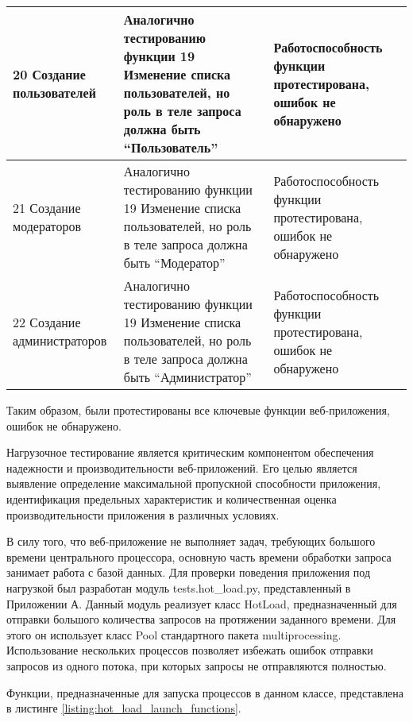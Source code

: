 \begin{longtable}{|
    p{33mm}|
    p{90mm}|
    p{42mm}|
}
    20 Создание пользователей & Аналогично тестированию функции 19 Изменение списка пользователей, но роль в теле запроса должна быть “Пользователь” & Работоспособность функции протестирована, ошибок не обнаружено \\ \hline
    21 Создание модераторов & Аналогично тестированию функции 19 Изменение списка пользователей, но роль в теле запроса должна быть “Модератор” & Работоспособность функции протестирована, ошибок не обнаружено \\ \hline
    22 Создание администраторов & Аналогично тестированию функции 19 Изменение списка пользователей, но роль в теле запроса должна быть “Администратор” & Работоспособность функции протестирована, ошибок не обнаружено \\ \hline
\end{longtable}

Таким образом, были протестированы все ключевые функции веб-приложения, ошибок не обнаружено.


Нагрузочное тестирование является критическим компонентом обеспечения надежности и производительности веб-приложений. Его целью является выявление определение максимальной пропускной способности приложения, идентификация предельных характеристик и количественная оценка производительности приложения в различных условиях.

В силу того, что веб-приложение не выполняет задач, требующих большого времени центрального процессора, основную часть времени обработки запроса занимает работа с базой данных. Для проверки поведения приложения под нагрузкой был разработан модуль tests.hot\_load.py, представленный в Приложении А. Данный модуль реализует класс HotLoad, предназначенный для отправки большого количества запросов на протяжении заданного времени. Для этого он использует класс Pool стандартного пакета multiprocessing. Использование нескольких процессов позволяет избежать ошибок отправки запросов из одного потока, при которых запросы не отправляются полностью.

Функции, предназначенные для запуска процессов в данном классе, представлена в листинге \ref{listing:hot_load_launch_functions}.

